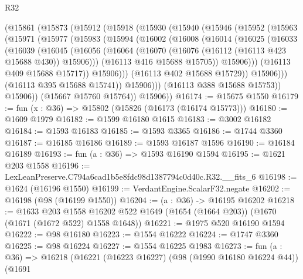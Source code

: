 \begin{lexlean}{R32}
\begin{coremodule}
      (@15861
        (@15873
          (@15912
            (@15918
              (@15930
                (@15940
                  (@15946
                    (@15952
                      (@15963
                        (@15971
                          (@15977
                            (@15983
                              (@15994
                                (@16002
                                  (@16008
                                    (@16014
                                      (@16025
                                        (@16033
                                          (@16039
                                            (@16045
                                              (@16056
                                                (@16064
                                                  (@16070
                                                    (@16076
                                                      (@16112 (@16113 @423 @15688 @430))
                                                      @15906)))
                                                (@16113 @416 @15688 @15705))
                                              @15906)))
                                        (@16113 @409 @15688 @15717))
                                      @15906)))
                                (@16113 @402 @15688 @15729))
                              @15906)))
                        (@16113 @395 @15688 @15741))
                      @15906)))
                (@16113 @388 @15688 @15753))
              @15906))
          (@15667 @15760 @15764))
        @15906))
@16174 := @15675 @1550
@16179 := fun (x : @36) => @15802 (@15826 (@16173 (@16174 @15773)))
@16180 := @1609 @1979
@16182 := @1599 @16180 @1615
@16183 := @3002 @16182
@16184 := @1593 @16183
@16185 := @1593 @3365
@16186 := @1744 @3360
@16187 := @16185 @16186
@16189 := @1593 @16187 @1596
@16190 := @16184 @16189
@16193 := fun (a : @36) => @1593 @16190 @1594
@16195 := @1621 @203 @1558
@16196 := LexLeanPreserve.C794a6cad1b5e8fdc98d1387794c0d40c.R32.__fits_6
@16198 := @1624 (@16196 @1550)
@16199 := VerdantEngine.ScalarF32.negate
@16202 := @16198 (@98 (@16199 @1550))
@16204 := (a : @36) -> @16195 @16202
@16218 := @1633
    @203
    @1558
    @16202
    @522
    @1649
    (@1654 (@1664 @203))
    (@1670 (@1671 (@1672 @522) @1558 @1648))
@16221 := @1975 @520 @16190 @1594
@16222 := @98 @16180
@16223 := @1554 @16222
@16224 := @1747 @3360
@16225 := @98 @16224
@16227 := @1554 @16225 @1983
@16273 := fun (a : @36) =>
  @16218
    (@16221
      (@16223 @16227)
      (@98 (@1990 @16180 @16224 @44))
      (@1691

\end{coremodule}
\end{lexlean}
